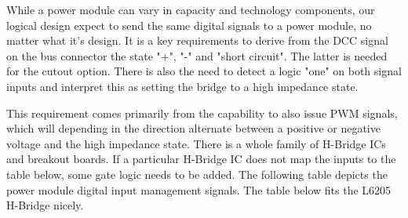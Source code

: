  \begin{center}
\end{center}

While a power module can vary in capacity and technology components, our logical design expect to send the same digital signals to a power module, no matter what it's design. It is a key requirements to derive from the DCC signal on the bus connector the state "+", "-" and "short circuit". The latter is needed for the cutout option. There is also the need to detect a logic "one" on both signal inputs and interpret this as setting the bridge to a high impedance state. 

This requirement comes primarily from the capability to also issue PWM signals, which will depending in the direction alternate between a positive or negative voltage and the high impedance state. There is a whole family of H-Bridge ICs and breakout boards. If a particular H-Bridge IC does not map the inputs to the table below, some gate logic needs to be added. The following table depicts the power module digital input management signals. The table below fits the L6205 H-Bridge nicely.

